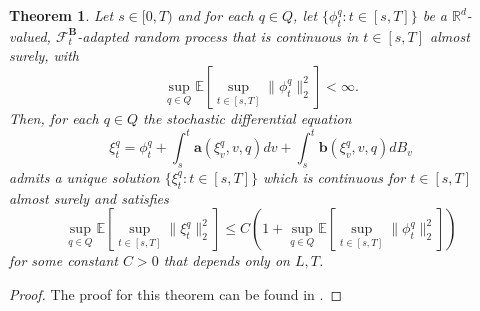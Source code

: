 \documentclass[12pt]{article}
\newtheorem{theorem}{Theorem}[section]
\theoremstyle{definition}
\numberwithin{equation}{section}
\newcommand{\R}{\mathbb{R}}
\newcommand{\CF}{\mathcal{F}}
\newcommand{\ev}[1]{\mathbb{E}\left[{#1}\right]}
\newcommand{\norm}[1]{\lVert{#1}\rVert_2}
\begin{document}
\begin{theorem}
  \label{thm:sde_existence}
  Let $s \in [0,T)$ and for each $q \in Q$, let $\{\phi_t^q : t \in [s,T]\}$ be a $\R^d$-valued, $\CF^\mathbf{B}_t$-adapted random process that is continuous in $t \in [s,T]$ almost surely, with
  \begin{equation*}
    \sup_{q \in Q} \ev{\sup_{t \in [s,T]} \norm{\phi^q_t}^2} < \infty.
  \end{equation*}
  Then, for each $q \in Q$ the stochastic differential equation
  \begin{equation*}
    \xi^q_t = \phi_t^q + \int_s^t \mathbf{a}(\xi^q_v,v,q)dv + \int_s^t\mathbf{b}(\xi_v^q, v, q)dB_v
  \end{equation*}
  admits a unique solution $\{\xi_t^q : t \in [s,T]\}$ which is continuous for $t\in [s,T]$ almost surely and satisfies
  \begin{equation*}
    \sup_{q \in Q} \ev{\sup_{t \in [s,T]} \norm{\xi^q_t}^2} \leq C \left( 1 + \sup_{q \in Q} \ev{\sup_{t \in [s,T]} \norm{\phi^q_t}^2}\right)
  \end{equation*}
  for some constant $C > 0$ that depends only on $L,T$.
\end{theorem}
\begin{proof}
  The proof for this theorem can be found in \cite{liStochasticModifiedEquations2019}.
\end{proof}
\end{document}

